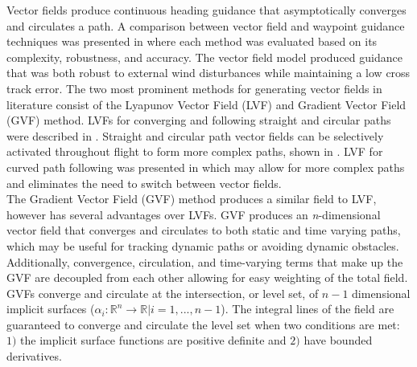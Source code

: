 \documentclass[conf]{new-aiaa}
\begin{document}

Vector fields produce continuous heading guidance that asymptotically converges and circulates a path. A comparison between vector field and waypoint guidance techniques was presented in \cite{sujit_unmanned_2014} where each method was evaluated based on its complexity, robustness, and accuracy. The vector field model produced guidance that was both robust to external wind disturbances while maintaining a low cross track error. The two most prominent methods for generating vector fields in literature consist of the Lyapunov Vector Field (LVF) \cite{nelson_cooperative_2005,nelson_vector_2006,nelson_vector_2007,frew_cooperative_2007,miao_orthogonal_2016,griffiths_vector_2006} and Gradient Vector Field (GVF) \cite{goncalves_artificial_2009,goncalves_circulation_2010,goncalves_vector_2010,gerlach_autonomous_2014} method. LVFs for converging and following straight and circular paths were described in \cite{nelson_cooperative_2005}. Straight and circular path vector fields can be selectively activated throughout flight to form more complex paths, shown in \cite{nelson_cooperative_2005,nelson_vector_2006,nelson_vector_2007,jung_unmanned_2016}. LVF for curved path following was presented in \cite{griffiths_vector_2006} which may allow for more complex paths and eliminates the need to switch between vector fields. \\

The Gradient Vector Field (GVF) method produces a similar field to LVF, however has several advantages over LVFs. GVF produces an \textit{n}-dimensional vector field that converges and circulates to both static and time varying paths, which may be useful for tracking dynamic paths or avoiding dynamic obstacles. Additionally, convergence, circulation, and time-varying terms that make up the GVF are decoupled from each other allowing for easy weighting of the total field. GVFs converge and circulate at the intersection, or level set, of $n-1$ dimensional implicit surfaces ($\alpha_i:\mathbb{R}^n\rightarrow\mathbb{R} | i=1,...,n-1$). The integral lines of the field are guaranteed to converge and circulate the level set when two conditions are met: $1)$ the implicit surface functions are positive definite and $2)$ have bounded derivatives. %
\end{document}
